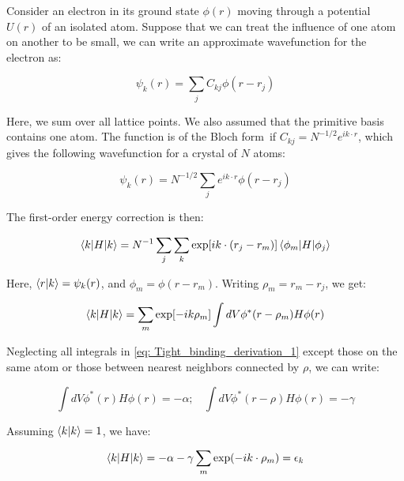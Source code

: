 \documentclass[]{article}
\begin{document}
Consider an electron in its ground state $\phi(r)$ moving through a potential $U(r)$ of an isolated atom. Suppose that we can treat the influence of one atom on another to be small, we can write an approximate wavefunction for the electron as:

\begin{equation}
	\psi_k(r) = \sum_j C_{kj}\phi(r-r_j)
\end{equation}

Here, we sum over all lattice points. We also assumed that the primitive basis contains one atom. The function is of the Bloch form\footnotemark \ if $C_{kj} = N^{-1/2}e^{ik\cdot r}$, which gives the following wavefunction for a crystal of $N$ atoms:


\begin{equation}
	\psi_k(r) = N^{-1/2}\sum_j e^{ik\cdot r} \phi(r-r_j)
\end{equation}

The first-order energy correction is then:

\begin{equation}
	\braket{k|H|k} = N^{-1} \sum_j \sum_k \exp[ik\cdot(r_j - r_m)] \braket{\phi_m | H | \phi_j}
\end{equation}

Here, $\braket{r|k} = \psi_k (r)$, and $\phi_m = \phi(r-r_m)$. Writing $\rho_m = r_m - r_j$, we get:

\begin{equation}\label{eq: Tight_binding_derivation_1}
	\braket{k|H|k} = \sum_m \exp[-ik\rho_m] \int dV \phi^{*}(r-\rho_m)H\phi(r)
\end{equation}

Neglecting all integrals in \ref{eq: Tight_binding_derivation_1} except those on the same atom or those between nearest neighbors connected by $\rho$, we can write:

\begin{equation}
	\int dV \phi^{*}(r)H\phi(r) = -\alpha ; \ \ \ \ \int dV \phi^{*}(r-\rho)H\phi(r) = -\gamma
\end{equation}

Assuming $\braket{k|k} = 1$, we have:

\begin{equation}\label{eq: tight_binding_hamiltonian_classical}
	\braket{k|H|k} = -\alpha -\gamma\sum_m \exp(-ik\cdot \rho_m) = \epsilon_k
\end{equation}
\end{document}
